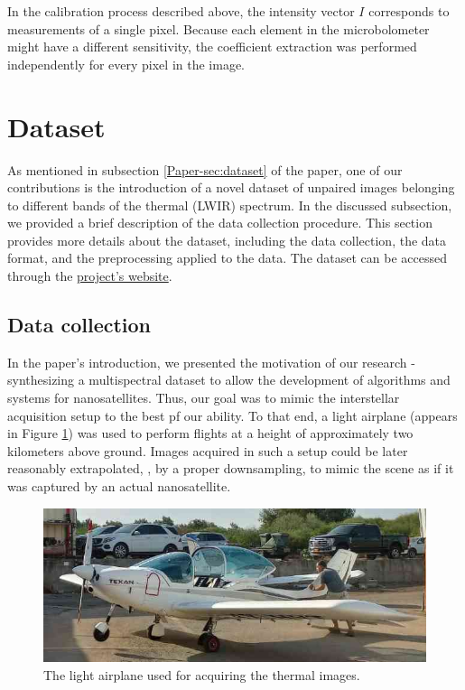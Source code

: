 \documentclass[10pt,twocolumn,letterpaper]{article}
\begin{document}
In the calibration process described above, the intensity vector $I$ corresponds to measurements of a single pixel.
Because each element in the microbolometer might have a different sensitivity, the coefficient extraction was performed independently for every pixel in the image.


\section{Dataset}
As mentioned in subsection \ref{Paper-sec:dataset} of the paper, one of our contributions is the introduction of a novel dataset of unpaired images belonging to different bands of the thermal (LWIR) spectrum.
In the discussed subsection, we provided a brief description of the data collection procedure.
This section provides more details about the dataset, including the data collection, the data format, and the preprocessing applied to the data.
The dataset can be accessed through the \href{https://bermanz.github.io/PETIT/}{project's website}.

\subsection{Data collection}
In the paper's introduction, we presented the motivation of our research - synthesizing a multispectral dataset to allow the development of algorithms and systems for nanosatellites.
Thus, our goal was to mimic the interstellar acquisition setup to the best pf our ability.
To that end, a light airplane (appears in Figure \ref{fig:light_airplane}) was used to perform flights at a height of approximately two kilometers above ground.
Images acquired in such a setup could be later reasonably extrapolated, \eg, by a proper downsampling, to mimic the scene as if it was captured by an actual nanosatellite.
\begin{figure}[h]
    \centering
    \includegraphics[width=0.8\linewidth]{../figs/data/light_airplane.jpeg}
    \caption{The light airplane used for acquiring the thermal images.}
    \label{fig:light_airplane}
\end{figure}
\end{document}
